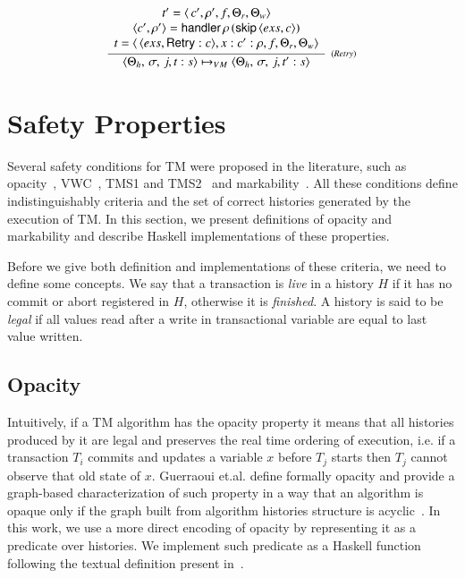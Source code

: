 \documentclass[3p,times,procedia]{elsarticle}
\theoremstyle{definition}
\newcommand{\C}[1]{\red{\mathsf{#1}}}
\newcommand{\F}[1]{\green{\mathsf{#1}}}
\begin{document}
\[
  \begin{array}{c}
     \infer[_{(Retry)}]
            {\langle \Theta_h,\,\sigma,\,j,t : s\rangle \mapsto_{VM}
             \langle \Theta_h,\,\sigma,\,j,t' : s\rangle}
            {\begin{array}{c}
               t' = \langle\,c', \rho', f, \Theta_r,\Theta_w\rangle \\
               \langle c', \rho' \rangle = \ensuremath{\F{handler}}\,\rho\,(\ensuremath{\F{skip}}\, \langle exs, c \rangle)\\
               t = \langle\,\langle exs, \ensuremath{\C{Retry}} : c\rangle,x : c' : \rho, f, \Theta_r,\Theta_w\rangle
             \end{array}}
  \end{array}
\]

\section{Safety Properties}\label{sec:stm-safety}

Several safety conditions for TM were proposed in the literature, such as opacity~\cite{Guerraoui2008},
VWC~\cite{Imbs2009}, TMS1 and TMS2~\cite{Doherty2009} and markability~\cite{LesaniP14}. All these conditions define
indistinguishably criteria and the set of correct histories generated by the execution of TM. In this section, we
present definitions of opacity and markability and describe Haskell implementations of these properties.

Before we give both definition and implementations of these criteria, we need to define some concepts. We say that a transaction
is \emph{live} in a history $H$ if it has no commit or abort registered in $H$, otherwise it is \emph{finished}. A history is said to be \emph{legal}
if all values read after a write in transactional variable are equal to last value written.

\subsection{Opacity}


Intuitively, if a TM algorithm has the opacity property it means that all histories produced by it are legal and
preserves the real time ordering of execution, i.e. if a transaction $T_i$ commits and updates a variable $x$ before
$T_j$ starts then $T_j$ cannot observe that old state of $x$. Guerraoui et.al. define formally opacity and provide a
graph-based characterization of such property in a way that an algorithm is opaque only if the graph built from algorithm
histories structure is acyclic~\cite{Guerraoui2008}. In this work, we use a more direct encoding of opacity by representing it
as a predicate over histories. We implement such predicate as a Haskell function following the textual definition
present in~\cite{Guerraoui2010}.
\end{document}
